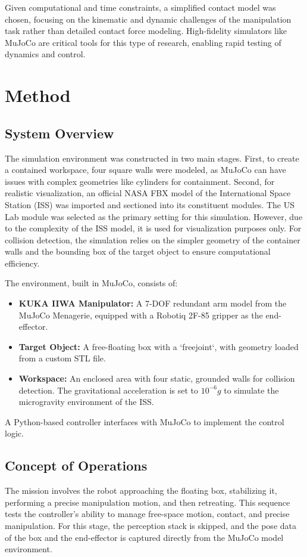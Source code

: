 \documentclass[journal]{IEEEtran}
\begin{document}
Given computational and time constraints, a simplified contact model was chosen, focusing on the kinematic and dynamic challenges of the manipulation task rather than detailed contact force modeling. High-fidelity simulators like MuJoCo are critical tools for this type of research, enabling rapid testing of dynamics and control.

\section{Method}
\subsection{System Overview}
The simulation environment was constructed in two main stages. First, to create a contained workspace, four square walls were modeled, as MuJoCo can have issues with complex geometries like cylinders for containment. Second, for realistic visualization, an official NASA FBX model of the International Space Station (ISS) was imported and sectioned into its constituent modules. The US Lab module was selected as the primary setting for this simulation. However, due to the complexity of the ISS model, it is used for visualization purposes only. For collision detection, the simulation relies on the simpler geometry of the container walls and the bounding box of the target object to ensure computational efficiency.

The environment, built in MuJoCo, consists of:
\begin{itemize}
    \item \textbf{KUKA IIWA Manipulator:} A 7-DOF redundant arm model from the MuJoCo Menagerie, equipped with a Robotiq 2F-85 gripper as the end-effector.
    \item \textbf{Target Object:} A free-floating box with a `freejoint`, with geometry loaded from a custom STL file.
    \item \textbf{Workspace:} An enclosed area with four static, grounded walls for collision detection. The gravitational acceleration is set to $10^{-6} g$ to simulate the microgravity environment of the ISS.
\end{itemize}
A Python-based controller interfaces with MuJoCo to implement the control logic.

\subsection{Concept of Operations}
The mission involves the robot approaching the floating box, stabilizing it, performing a precise manipulation motion, and then retreating. This sequence tests the controller's ability to manage free-space motion, contact, and precise manipulation. For this stage, the perception stack is skipped, and the pose data of the box and the end-effector is captured directly from the MuJoCo model environment.
\end{document}
